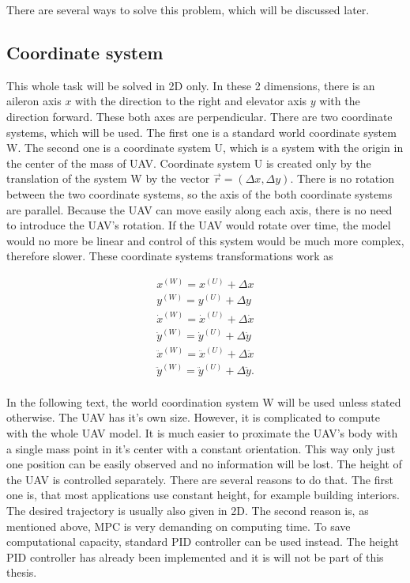 \documentclass{article}
\begin{document}
There are several ways to solve this problem, which will be discussed later.





\subsection{Coordinate system}
\label{ssec:coordinate_system}
This whole task will be solved in 2D only. In these 2 dimensions, there is an aileron axis $x$ with the direction to the right and elevator axis $y$ with the direction forward. These both axes are perpendicular. There are two coordinate systems, which will be used. The first one is a standard world coordinate system W. The second one is a coordinate system U, which is a system with the origin in the center of the mass of UAV. Coordinate system U is created only by the translation of the system W by the vector $\vec{r} = (\Delta x, \Delta y)$. There is no rotation between the two coordinate systems, so the axis of the both coordinate systems are parallel. Because the UAV can move easily along each axis, there is no need to introduce the UAV's rotation. If the UAV would rotate over time, the model would no more be linear and control of this system would be much more complex, therefore slower. These coordinate systems transformations work as

\begin{equation}
\label{eq:coordinate_transform}
\begin{split}
x^{(W)} = x^{(U)}+\Delta x	\\
y^{(W)} = y^{(U)}+\Delta y	\\
\dot{x}^{(W)} = \dot{x}^{(U)}+\Delta \dot{x}	\\
\dot{y}^{(W)} = \dot{y}^{(U)}+\Delta \dot{y}	\\
\ddot{x}^{(W)} = \ddot{x}^{(U)}+\Delta \ddot{x}	\\
\ddot{y}^{(W)} = \ddot{y}^{(U)}+\Delta \ddot{y}.	\\
\end{split}
\end{equation}

In the following text, the world coordination system W will be used unless stated otherwise. 
The UAV has it's own size. However, it is complicated to compute with the whole UAV model. It is much easier to proximate the UAV's body with a single mass point in it's center with a constant orientation. This way only just one position can be easily observed and no information will be lost.  The height of the UAV is controlled separately. There are several reasons to do that. The first one is, that most applications use constant height, for example building interiors. The desired trajectory is usually also given in 2D. The second reason is, as mentioned above, MPC is very demanding on computing time. To save computational capacity, standard PID controller can be used instead. The height PID controller has already been implemented \cite{tomas} and it is will not be part of this thesis. 
\end{document}
